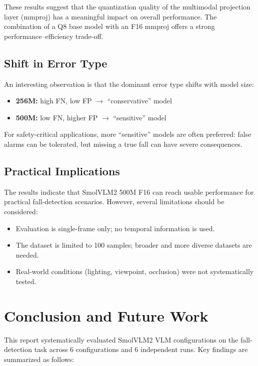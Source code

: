 \documentclass[12pt, a4paper]{article}
\begin{document}
These results suggest that the quantization quality of the multimodal projection
layer (mmproj) has a meaningful impact on overall performance. The combination
of a Q8 base model with an F16 mmproj offers a strong
performance--efficiency trade-off.

\subsection{Shift in Error Type}

An interesting observation is that the dominant error type shifts with model size:
\begin{itemize}
    \item \textbf{256M:} high FN, low FP $\rightarrow$ ``conservative'' model
    \item \textbf{500M:} low FN, higher FP $\rightarrow$ ``sensitive'' model
\end{itemize}

For safety-critical applications, more ``sensitive'' models are often preferred:
false alarms can be tolerated, but missing a true fall can have severe consequences.

\subsection{Practical Implications}

The results indicate that SmolVLM2 500M F16 can reach usable performance for
practical fall-detection scenarios. However, several limitations should be considered:
\begin{itemize}
    \item Evaluation is single-frame only; no temporal information is used.
    \item The dataset is limited to 100 samples; broader and more diverse datasets are needed.
    \item Real-world conditions (lighting, viewpoint, occlusion) were not systematically tested.
\end{itemize}

\section{Conclusion and Future Work}

This report systematically evaluated SmolVLM2 VLM configurations on the
fall-detection task across 6 configurations and 6 independent runs.
Key findings are summarized as follows:
\end{document}
